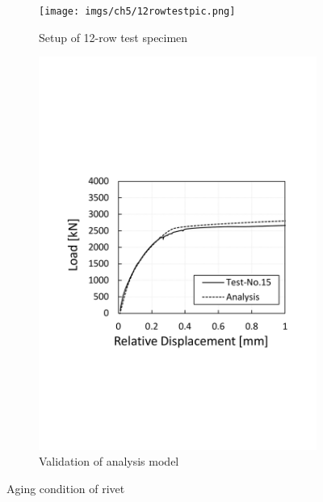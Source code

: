 \begin{figure}
    \centering
    \begin{subfigure}[t]{0.4\textwidth}
        \centering
        \texttt{[image: imgs/ch5/12rowtestpic.png]}
        \caption{Setup of 12-row test specimen}
        \label{fig-testset}
    \end{subfigure}
    \hfill
    \begin{subfigure}[t]{0.55\textwidth}
        \centering
        \includegraphics[width=\linewidth]{imgs/ch5/validation.pdf}
        \caption{Validation of analysis model}
        \label{fig-validloadrd}
    \end{subfigure}
    \caption{Aging condition of rivet}
\end{figure}